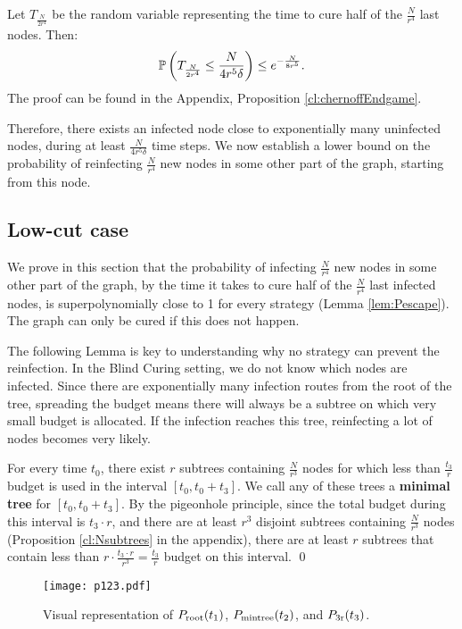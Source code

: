 \begin{proposition} 
Let $T_{\frac{N}{2r^4}}$ be the random variable representing the time to cure half of the $\frac{N}{r^4}$ last nodes. Then: 
$$\mathbb{P}\left(T_{\frac{N}{2r^4}} \leq \frac{N}{4r^5\delta}\right) \leq e^{-\frac{N}{8r^5}}.$$
\proof The proof can be found in the Appendix, Proposition \ref{cl:chernoffEndgame}.
\end{proposition}

Therefore, there exists an infected node close to exponentially many uninfected nodes, during at least $\frac{N}{4r^5 \delta}$ time steps. We now establish a lower bound on the probability of reinfecting $\frac{N}{r^4}$ new nodes in some other part of the graph, starting from this node.

\subsection{Low-cut case} \label{sec:BlindCuring}
We prove in this section that the probability of infecting $\frac{N}{r^4}$ new nodes in some other part of the graph, by the time it takes to cure half of the $\frac{N}{r^4}$ last infected nodes, is superpolynomially close to 1 for every strategy (Lemma \ref{lem:Pescape}). The graph can only be cured if this does not  happen.

The following Lemma is key to understanding why no strategy can prevent the reinfection. In the Blind Curing setting, we do not know which nodes are infected. Since there are exponentially many infection routes from the root of the tree, spreading the budget means there will always be a subtree on which very small budget is allocated. If the infection reaches this tree, reinfecting a lot of nodes becomes very likely.
\begin{lemma} \label{lem:minimalTree} 
For every time $t_0$, there exist $r$ subtrees containing $\frac{N}{r^3}$ nodes for which less than $\frac{t_3}{r}$ budget is used in the interval $[t_0, t_0 + t_3]$. We call any of these trees a \textbf{minimal tree} for $[t_0, t_0 + t_3]$.
\proof By the pigeonhole principle, since the total budget during this interval is $t_3 \cdot r$, and there are at least $r^3$ disjoint subtrees containing $\frac{N}{r^3}$ nodes (Proposition \ref{cl:Nsubtrees} in the appendix), there are at least $r$ subtrees that contain less than $ r \cdot \frac{t_3 \cdot r}{r^3} = \frac{t_3}{r}$ budget on this interval. \qed 
\end{lemma}

\begin{figure}[H]
\centering\texttt{[image: p123.pdf]}
\caption{Visual representation of $P_{\rm root}(t_1)$, $P_{\rm mintree}(t_2)$, and $P_{\rm 3r}(t_3)$.}
\end{figure}

